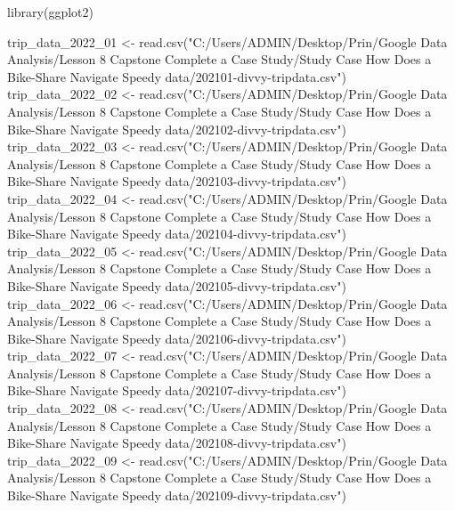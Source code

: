 \documentclass[
]{article}
\newenvironment{Shaded}{\begin{snugshade}}{\end{snugshade}}
\newcommand{\FunctionTok}[1]{\textcolor[rgb]{0.00,0.00,0.00}{#1}}
\newcommand{\NormalTok}[1]{#1}
\newcommand{\OtherTok}[1]{\textcolor[rgb]{0.56,0.35,0.01}{#1}}
\newcommand{\StringTok}[1]{\textcolor[rgb]{0.31,0.60,0.02}{#1}}
\begin{document}
\begin{Shaded}
\begin{Highlighting}[]
\FunctionTok{library}\NormalTok{(ggplot2)}

\NormalTok{trip\_data\_2022\_01 }\OtherTok{\textless{}{-}} \FunctionTok{read.csv}\NormalTok{(}\StringTok{"C:/Users/ADMIN/Desktop/Prin/Google Data Analysis/Lesson 8 Capstone Complete a Case Study/Study Case How Does a Bike{-}Share Navigate Speedy data/202101{-}divvy{-}tripdata.csv"}\NormalTok{)}
\NormalTok{trip\_data\_2022\_02 }\OtherTok{\textless{}{-}} \FunctionTok{read.csv}\NormalTok{(}\StringTok{"C:/Users/ADMIN/Desktop/Prin/Google Data Analysis/Lesson 8 Capstone Complete a Case Study/Study Case How Does a Bike{-}Share Navigate Speedy data/202102{-}divvy{-}tripdata.csv"}\NormalTok{)}
\NormalTok{trip\_data\_2022\_03 }\OtherTok{\textless{}{-}} \FunctionTok{read.csv}\NormalTok{(}\StringTok{"C:/Users/ADMIN/Desktop/Prin/Google Data Analysis/Lesson 8 Capstone Complete a Case Study/Study Case How Does a Bike{-}Share Navigate Speedy data/202103{-}divvy{-}tripdata.csv"}\NormalTok{)}
\NormalTok{trip\_data\_2022\_04 }\OtherTok{\textless{}{-}} \FunctionTok{read.csv}\NormalTok{(}\StringTok{"C:/Users/ADMIN/Desktop/Prin/Google Data Analysis/Lesson 8 Capstone Complete a Case Study/Study Case How Does a Bike{-}Share Navigate Speedy data/202104{-}divvy{-}tripdata.csv"}\NormalTok{)}
\NormalTok{trip\_data\_2022\_05 }\OtherTok{\textless{}{-}} \FunctionTok{read.csv}\NormalTok{(}\StringTok{"C:/Users/ADMIN/Desktop/Prin/Google Data Analysis/Lesson 8 Capstone Complete a Case Study/Study Case How Does a Bike{-}Share Navigate Speedy data/202105{-}divvy{-}tripdata.csv"}\NormalTok{)}
\NormalTok{trip\_data\_2022\_06 }\OtherTok{\textless{}{-}} \FunctionTok{read.csv}\NormalTok{(}\StringTok{"C:/Users/ADMIN/Desktop/Prin/Google Data Analysis/Lesson 8 Capstone Complete a Case Study/Study Case How Does a Bike{-}Share Navigate Speedy data/202106{-}divvy{-}tripdata.csv"}\NormalTok{)}
\NormalTok{trip\_data\_2022\_07 }\OtherTok{\textless{}{-}} \FunctionTok{read.csv}\NormalTok{(}\StringTok{"C:/Users/ADMIN/Desktop/Prin/Google Data Analysis/Lesson 8 Capstone Complete a Case Study/Study Case How Does a Bike{-}Share Navigate Speedy data/202107{-}divvy{-}tripdata.csv"}\NormalTok{)}
\NormalTok{trip\_data\_2022\_08 }\OtherTok{\textless{}{-}} \FunctionTok{read.csv}\NormalTok{(}\StringTok{"C:/Users/ADMIN/Desktop/Prin/Google Data Analysis/Lesson 8 Capstone Complete a Case Study/Study Case How Does a Bike{-}Share Navigate Speedy data/202108{-}divvy{-}tripdata.csv"}\NormalTok{)}
\NormalTok{trip\_data\_2022\_09 }\OtherTok{\textless{}{-}} \FunctionTok{read.csv}\NormalTok{(}\StringTok{"C:/Users/ADMIN/Desktop/Prin/Google Data Analysis/Lesson 8 Capstone Complete a Case Study/Study Case How Does a Bike{-}Share Navigate Speedy data/202109{-}divvy{-}tripdata.csv"}\NormalTok{)}

\end{Highlighting}
\end{Shaded}
\end{document}
